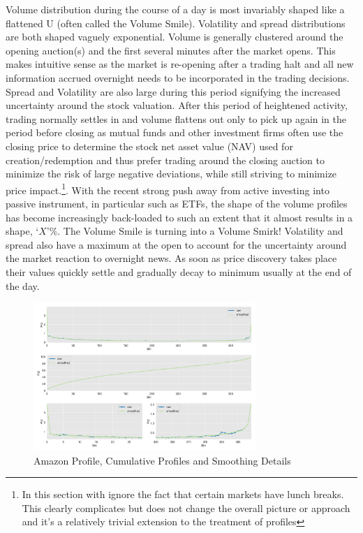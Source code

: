 Volume distribution during the course of a day is most invariably shaped like a flattened U (often called the Volume Smile). Volatility and spread distributions are both shaped vaguely exponential. Volume is generally clustered around the opening auction(s) and the first several minutes after the market opens. This makes intuitive sense as the market is re-opening after a trading halt and all new information accrued overnight needs to be incorporated in the trading decisions. Spread and Volatility are also large during this period signifying the increased uncertainty around the stock valuation. After this period of heightened activity,  trading normally settles in and volume flattens out only to pick up again in the period before closing as mutual funds and other investment firms often use the closing price to determine the stock net asset value (NAV) used for creation/redemption and thus prefer trading around the closing auction to minimize the risk of large negative deviations, while still striving to minimize price impact.\footnote{In this section with ignore the fact that certain markets have lunch breaks. This clearly complicates but does not change the overall picture or approach and it's a relatively trivial extension to the treatment of profiles}. With the recent strong push away from active investing into passive instrument, in particular such as ETFs, the shape of the volume profiles has become increasingly back-loaded to such an extent that it almost results in a shape, `$X$'\%. The Volume Smile is turning into a Volume Smirk! Volatility and spread also have a maximum at the open to account for the uncertainty around the market reaction to  overnight news. As soon as price discovery takes place their values quickly settle and gradually decay to minimum usually at the end of the day.\\

\textnote{TODO:  DN. Confirm of the total volume of many stocks happen in the last hour of the trading day]} 

\begin{figure}[!ht]
		\centering
			\includegraphics[width=0.75\textwidth]{chapters/chapter_trade_data_models/figures/amzn_profile.png} 
		\caption{Amazon Profile, Cumulative Profiles and Smoothing Details\label{fig:adv}}
\end{figure}

